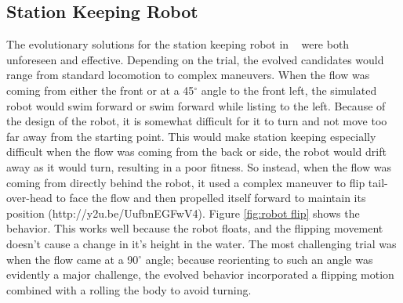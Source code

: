 \documentclass{sig-alternate}
\begin{document}
\subsection{Station Keeping Robot}\label{Moore behavior}
  The evolutionary solutions for the station keeping robot in ~\cite{Moore:2013:ESK:2463372.2463402} were both unforeseen and effective. Depending on the trial, the evolved candidates would range from standard locomotion to complex maneuvers. When the flow was coming from either the front or at a 45$^\circ$ angle to the front left, the simulated robot would swim forward or swim forward while listing to the left. Because of the design of the robot, it is somewhat difficult for it to turn and not move too far away from the starting point. This would make station keeping especially difficult when the flow was coming from the back or side, the robot would drift away as it would turn, resulting in a poor fitness. So instead, when the flow was coming from directly behind the robot, it used a complex maneuver to flip tail-over-head to face the flow and then propelled itself forward to maintain its position (http://y2u.be/UufbnEGFwV4). Figure \ref{fig:robot flip} shows the behavior. This works well because the robot floats, and the flipping movement doesn't cause a change in it's height in the water. The most challenging trial was when the flow came at a 90$^\circ$ angle; because reorienting to such an angle was evidently a major challenge, the evolved behavior incorporated a flipping motion combined with a rolling the body to avoid turning.
 
\end{document}
